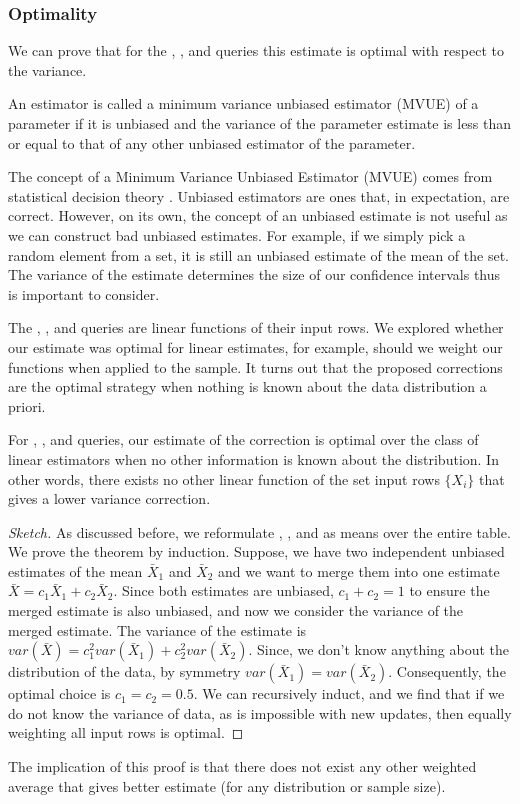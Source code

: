 \subsubsection{Optimality}
We can prove that for the \sumfunc, \countfunc, and \avgfunc queries this estimate is optimal with respect to the variance.
\begin{proposition}
An estimator is called a minimum variance unbiased estimator (MVUE) of a parameter if it is unbiased and the variance of the parameter estimate is less than or equal to that of any other unbiased estimator of the parameter.
\end{proposition}
The concept of a Minimum Variance Unbiased Estimator (MVUE) comes from statistical decision theory \cite{cox1979theoretical}.
Unbiased estimators are ones that, in expectation, are correct.
However, on its own, the concept of an unbiased estimate is not useful as we can construct bad unbiased estimates.
For example, if we simply pick a random element from a set, it is still an unbiased estimate of the mean of the set.
The variance of the estimate determines the size of our confidence intervals thus is important to consider.

The \sumfunc, \countfunc, and \avgfunc queries are linear functions of their input rows.
We explored whether our estimate was optimal for linear estimates, for example, should we weight our functions when applied to the sample.
It turns out that the proposed corrections are the optimal strategy when nothing is known about the data distribution a priori.

\begin{theorem}
For \sumfunc, \countfunc, and \avgfunc queries, our estimate of the correction is optimal over the class of linear estimators when no other information is known about the distribution. 
In other words, there exists no other linear function of the set input rows $\{ X_i \}$ that gives a lower variance correction.
\end{theorem}
\begin{proof}[Sketch]
As discussed before, we reformulate \sumfunc, \countfunc, and \avgfunc as means over the entire table. We prove the theorem by induction. 
Suppose, we have two independent unbiased estimates of the mean $\bar{X}_1$ and $\bar{X}_2$ and we want to merge them into one estimate $\bar{X} = c_1\bar{X}_1+c_2\bar{X}_2$.
Since both estimates are unbiased, $c_1 + c_2 = 1$ to ensure the merged estimate is also unbiased, and now we consider the variance of the merged estimate.
The variance of the estimate is $var(\bar{X}) = c_1^2var(\bar{X}_1) + c_2^2var(\bar{X}_2)$.
Since, we don't know anything about the distribution of the data, by symmetry $var(\bar{X}_1) = var(\bar{X}_2)$.
Consequently, the optimal choice is $c_1=c_2=0.5$. 
We can recursively induct, and we find that if we do not know the variance of data, as is impossible with new updates, then equally weighting all input rows is optimal. 
\end{proof}
The implication of this proof is that there does not exist any other weighted average that gives better estimate (for any distribution or sample size).

